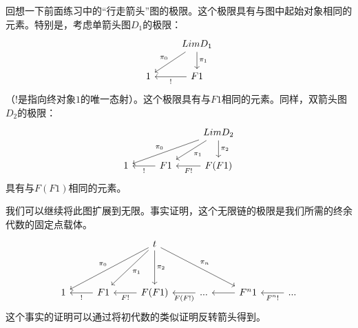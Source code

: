 \documentclass[DaoFP]{subfiles}
\begin{document}
    回想一下前面练习中的“行走箭头”图的极限。这个极限具有与图中起始对象相同的元素。特别是，考虑单箭头图$D_1$的极限：
    \[
        \begin{tikzcd}
            & Lim D_1
            \arrow[dl, "\pi_0"']
            \arrow[d, "\pi_1"]
            \\
            1
            & F1
            \arrow[l, "!"]
        \end{tikzcd}
    \]
    （$!$是指向终对象$1$的唯一态射）。这个极限具有与$F 1$相同的元素。同样，双箭头图$D_2$的极限：
    \[
        \begin{tikzcd}
            && Lim D_2
            \arrow[dll, "\pi_0"']
            \arrow[dl, "\pi_1"]
            \arrow[d, "\pi_2"]
            \\
            1
            & F1
            \arrow[l, "!"]
            & F(F 1)
            \arrow[l, "F !"]
        \end{tikzcd}
    \]
    具有与$F(F 1)$相同的元素。

    我们可以继续将此图扩展到无限。事实证明，这个无限链的极限是我们所需的终余代数的固定点载体。
    \[
        \begin{tikzcd}
            && t
            \arrow[ddll, "\pi_0"']
            \arrow[ddl, "\pi_1"]
            \arrow[dd, "\pi_2"]
            \arrow[ddrr, "\pi_n"]
            \\
            \\
            1
            & F 1
            \arrow[l, "!"]
            & F (F 1)
            \arrow[l, "F !"]
            & ...
            \arrow[l, "F(F !)"]
            & F^n 1
            \arrow[l]
            & ...
            \arrow[l, "F^n !"]
        \end{tikzcd}
    \]
    这个事实的证明可以通过将初代数的类似证明反转箭头得到。
\end{document}
